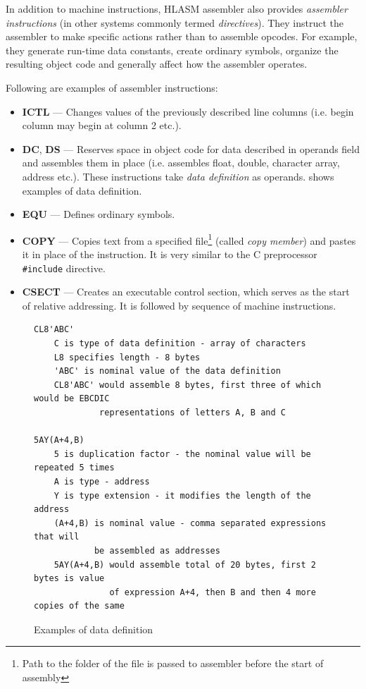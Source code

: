 In addition to machine instructions, HLASM assembler also provides \emph{assembler instructions} (in other systems commonly termed \emph{directives}). They instruct the assembler to make specific actions rather than to assemble opcodes. For example, they generate run-time data constants, create ordinary symbols, organize the resulting object code and generally affect how the assembler operates.

Following are examples of assembler instructions:
\begin{itemize}
	\item \textbf{ICTL} --- Changes values of the previously described line columns (i.e. begin column may begin at column 2 etc.).
	
	\item \textbf{DC}, \textbf{DS} --- Reserves space in object code for data described in operands field and assembles them in place (i.e. assembles float, double, character array, address etc.). These instructions take \emph{data definition} as operands.  shows examples of data definition.
	
	\item \textbf{EQU} --- Defines ordinary symbols.
	
	\item \textbf{COPY} --- Copies text from a specified file\footnote{Path to the folder of the file is passed to assembler before the start of assembly} (called \emph{copy member}) and pastes it in place of the instruction. It is very similar to the C preprocessor \texttt{\#include} directive.
	
	\item \textbf{CSECT} --- Creates an executable control section, which serves as the start of relative addressing. It is followed by sequence of machine instructions.
\end{itemize}

\begin{figure}[t]
	\begin{verbatim}
CL8'ABC'
    C is type of data definition - array of characters
    L8 specifies length - 8 bytes
    'ABC' is nominal value of the data definition
    CL8'ABC' would assemble 8 bytes, first three of which would be EBCDIC
             representations of letters A, B and C

5AY(A+4,B)
    5 is duplication factor - the nominal value will be repeated 5 times
    A is type - address
    Y is type extension - it modifies the length of the address
    (A+4,B) is nominal value - comma separated expressions that will
            be assembled as addresses
    5AY(A+4,B) would assemble total of 20 bytes, first 2 bytes is value
               of expression A+4, then B and then 4 more copies of the same
	\end{verbatim}
	\caption{Examples of data definition}
	\label{data_def_example}
\end{figure}

